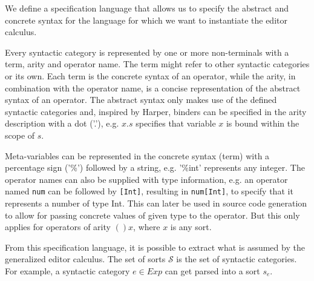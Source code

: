 \documentclass[sigplan]{acmart}
\begin{document}
We define a specification language that allows us to specify the
abstract and concrete syntax for the language for which we want to
instantiate the editor calculus.


Every syntactic category is represented by one or more non-terminals
with a term, arity and operator name. The term might refer to other
syntactic categories or its own. Each term is the concrete syntax of
an operator, while the arity, in combination with the operator name,
is a concise representation of the abstract syntax of an operator.
The abstract syntax only makes use of the defined syntactic categories
and, inspired by Harper\cite{harper_foundations}, binders can be
specified in the arity description with a dot ('.'), e.g. $x.s$
specifies that variable $x$ is bound within the scope of $s$.

Meta-variables can be represented in the concrete syntax (term) with a
percentage sign ('\%') followed by a string, e.g. '\%int' represents
any integer. The operator names can also be supplied with type
information, e.g. an operator named \texttt{num} can be followed by
\texttt{[Int]}, resulting in \texttt{num[Int]}, to specify that it
represents a number of type Int. This can later be used in source code
generation to allow for passing concrete values of given type to the
operator. But this only applies for operators of arity $()x$, where
$x$ is any sort.

From this specification language, it is possible to extract what is assumed by the generalized editor calculus. The set of sorts $\mathcal{S}$ is the set of syntactic categories. For example, a syntactic category $e \in Exp$ can get parsed into a sort $s_{e}$.
\end{document}
